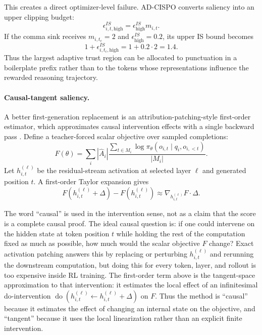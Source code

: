 \documentclass[11pt]{article}
\begin{document}
This creates a direct optimizer-level failure. AD-CISPO converts saliency into
an upper clipping budget:
\begin{equation}
  \epsilon^{IS}_{i,t,\mathrm{high}}
  =
  \epsilon^{IS}_{\mathrm{high}} m_{i,t}.
\end{equation}
If the comma sink receives $m_{i,t_c}=2$ and
$\epsilon^{IS}_{\mathrm{high}}=0.2$, its upper IS bound becomes
\begin{equation}
  1+\epsilon^{IS}_{i,t_c,\mathrm{high}}
  =
  1+0.2 \cdot 2
  =
  1.4.
\end{equation}
Thus the largest adaptive trust region can be allocated to punctuation in a
boilerplate prefix rather than to the tokens whose representations influence
the rewarded reasoning trajectory.

\paragraph{Causal-tangent saliency.}
A better first-generation replacement is an attribution-patching-style
first-order estimator, which approximates causal intervention effects with a
single backward pass \cite{meng2022rome,wang2022ioi,syed2023attribution}.
Define a teacher-forced scalar objective over sampled completions:
\begin{equation}
  F(\theta)
  =
  \sum_i
  |\hat{A}_i|
  \frac{
    \sum_{t \in M_i}
    \log \pi_\theta(o_{i,t}\mid q_i,o_{i,<t})
  }{|M_i|}.
\end{equation}
Let $h^{(\ell)}_{i,t}$ be the residual-stream activation at selected layer
$\ell$ and generated position $t$. A first-order Taylor expansion gives
\begin{equation}
  F(h^{(\ell)}_{i,t}+\Delta)
  -
  F(h^{(\ell)}_{i,t})
  \approx
  \nabla_{h^{(\ell)}_{i,t}} F \cdot \Delta.
\end{equation}

The word ``causal'' is used in the intervention sense, not as a claim that the
score is a complete causal proof. The ideal causal question is: if one could
intervene on the hidden state at token position $t$ while holding the rest of
the computation fixed as much as possible, how much would the scalar objective
$F$ change? Exact activation patching answers this by replacing or perturbing
$h^{(\ell)}_{i,t}$ and rerunning the downstream computation, but doing this for
every token, layer, and rollout is too expensive inside RL training. The
first-order term above is the tangent-space approximation to that intervention:
it estimates the local effect of an infinitesimal do-intervention
$\operatorname{do}(h^{(\ell)}_{i,t}\leftarrow h^{(\ell)}_{i,t}+\Delta)$ on
$F$. Thus the method is ``causal'' because it estimates the effect of changing
an internal state on the objective, and ``tangent'' because it uses the local
linearization rather than an explicit finite intervention.
\end{document}
